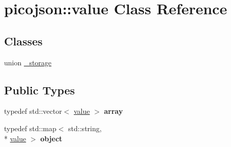 \hypertarget{classpicojson_1_1value}{\section{picojson\+:\+:value Class Reference}
\label{classpicojson_1_1value}
}
\subsection*{Classes}
\begin{DoxyCompactItemize}
\item 
union \hyperlink{unionpicojson_1_1value_1_1__storage}{\+\_\+storage}
\end{DoxyCompactItemize}
\subsection*{Public Types}
\begin{DoxyCompactItemize}
\item 
\hypertarget{classpicojson_1_1value_adeff4fdf7ee5675eeb7686bb89233c43}{typedef std\+::vector$<$ \hyperlink{classpicojson_1_1value}{value} $>$ {\bfseries array}}\label{classpicojson_1_1value_adeff4fdf7ee5675eeb7686bb89233c43}

\item 
\hypertarget{classpicojson_1_1value_a7d7da11d54d7b983a902d28367bda9c1}{typedef std\+::map$<$ std\+::string, \\*
\hyperlink{classpicojson_1_1value}{value} $>$ {\bfseries object}}\label{classpicojson_1_1value_a7d7da11d54d7b983a902d28367bda9c1}

\end{DoxyCompactItemize}
